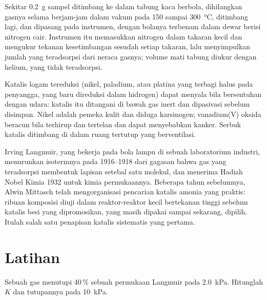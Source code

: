 \begin{inthelab}
Sekitar \qty{0.2}{g} sampel ditimbang ke dalam tabung kaca berbola, dihilangkan
gasnya selama berjam-jam dalam vakum pada 150 sampai \qty{300}{\celsius}, ditimbang lagi, dan dipasang
pada instrumen, dengan bolanya terbenam dalam dewar berisi nitrogen cair.
Instrumen itu memasukkan nitrogen dalam takaran kecil dan mengukur tekanan
kesetimbangan sesudah setiap takaran, lalu menyimpulkan jumlah yang
teradsorpsi dari neraca gasnya; volume mati tabung diukur dengan helium, yang
tidak teradsorpsi.
\end{inthelab}

\begin{safety}{}
Katalis logam tereduksi (nikel, paladium, atau platina yang terbagi halus pada
penyangga, yang baru direduksi dalam hidrogen) dapat menyala bila bersentuhan
dengan udara: katalis itu ditangani di bawah gas inert dan dipasivasi sebelum
disimpan. Nikel adalah pemeka kulit dan diduga karsinogen; vanadium(V) oksida
beracun bila terhirup dan tertelan dan dapat menyebabkan kanker. Serbuk
katalis ditimbang di dalam ruang tertutup yang berventilasi.
\end{safety}

\begin{history}
Irving Langmuir, yang bekerja pada bola lampu di sebuah laboratorium industri,
menurunkan isotermnya pada 1916--1918 dari gagasan bahwa gas yang teradsorpsi
membentuk lapisan setebal satu molekul, dan menerima Hadiah Nobel Kimia 1932
untuk kimia permukaannya. Beberapa tahun sebelumnya, Alwin Mittasch telah
mengorganisasi pencarian katalis amonia yang praktis: ribuan komposisi diuji
dalam reaktor-reaktor kecil bertekanan tinggi sebelum katalis besi yang
dipromosikan, yang masih dipakai sampai sekarang, dipilih. Itulah salah satu
penapisan katalis sistematis yang pertama.
\end{history}

\section{Latihan}

\begin{exercise}[$\star$]\label{exo:b3:surfaces-catalysis:1}
Sebuah gas menutupi 40\,\% sebuah permukaan Langmuir pada \qty{2.0}{kPa}. Hitunglah $K$ dan tutupannya pada
\qty{10}{kPa}.
\end{exercise}

